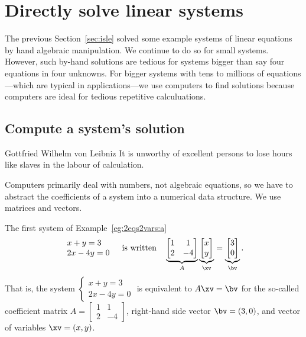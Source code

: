 
\section{Directly solve linear systems}
\label{sec:dmsls}
\secttoc

\begin{comment}
\pooliv{p.64--82}  \layiv{\S1.2} \holti{\S1.2}
\end{comment}




The previous Section~\ref{sec:isle} solved some example systems of linear equations by hand algebraic manipulation.  
We  continue to do so for small systems.  
However, such by-hand solutions are tedious for systems bigger than say four equations in four unknowns.  
For bigger systems with tens to millions of equations---which are typical in applications---we use computers to find solutions because computers are ideal for tedious repetitive calculuations.


\subsection{Compute a system's solution}

\begin{quoted}{Gottfried Wilhelm von Leibniz}
It is unworthy of excellent persons to lose hours like slaves in the labour of calculation.
\end{quoted}

Computers primarily deal with numbers, not algebraic equations, so we have to abstract the coefficients of a system into a numerical data structure.
We use matrices and vectors.
\begin{example} \label{eg:}
The first system of Example~\ref{eg:2eqs2vars:a}
\begin{equation*}
\begin{array}{l} x+y=3\\2x-4y=0 \end{array}
\quad\text{is written}\quad
\underbrace{\begin{bmatrix} 1&1\\2&-4 \end{bmatrix}}_A
\underbrace{\begin{bmatrix} x\\y \end{bmatrix}}_\xv
=\underbrace{\begin{bmatrix} 3\\0 \end{bmatrix}}_\bv .
\end{equation*}
That is, the system \(\begin{cases} x+y=3\\2x-4y=0 \end{cases}\)
is equivalent to \(A\xv=\bv\) for the so-called coefficient matrix \(A=\begin{bmatrix} 1&1\\2&-4 \end{bmatrix}\), right-hand side vector \(\bv=(3,0)\), and vector of variables \(\xv=(x,y)\).
\end{example}


